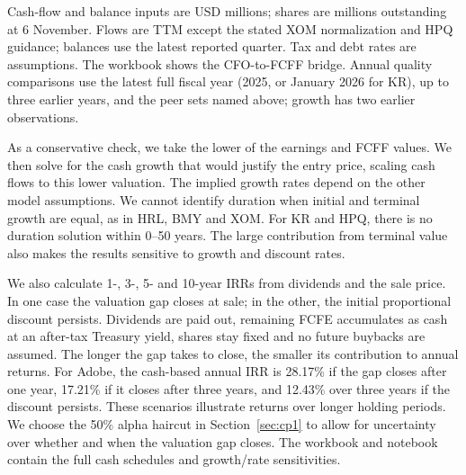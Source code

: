 \documentclass[10pt,a4paper]{article}
\begin{document}
{\footnotesize Cash-flow and balance inputs are USD millions; shares are millions outstanding at 6 November. Flows are TTM except the stated XOM normalization and HPQ guidance; balances use the latest reported quarter. Tax and debt rates are assumptions. The workbook shows the CFO-to-FCFF bridge. Annual quality comparisons use the latest full fiscal year (2025, or January 2026 for KR), up to three earlier years, and the peer sets named above; growth has two earlier observations.}

As a conservative check, we take the lower of the earnings and FCFF values. We then solve for the cash growth that would justify the entry price, scaling cash flows to this lower valuation. The implied growth rates depend on the other model assumptions. We cannot identify duration when initial and terminal growth are equal, as in HRL, BMY and XOM. For KR and HPQ, there is no duration solution within 0--50 years. The large contribution from terminal value also makes the results sensitive to growth and discount rates.

We also calculate 1-, 3-, 5- and 10-year IRRs from dividends and the sale price. In one case the valuation gap closes at sale; in the other, the initial proportional discount persists. Dividends are paid out, remaining FCFE accumulates as cash at an after-tax Treasury yield, shares stay fixed and no future buybacks are assumed. The longer the gap takes to close, the smaller its contribution to annual returns. For Adobe, the cash-based annual IRR is 28.17\% if the gap closes after one year, 17.21\% if it closes after three years, and 12.43\% over three years if the discount persists. These scenarios illustrate returns over longer holding periods. We choose the 50\% alpha haircut in Section~\ref{sec:cp1} to allow for uncertainty over whether and when the valuation gap closes. The workbook and notebook contain the full cash schedules and growth/rate sensitivities.
\end{document}

